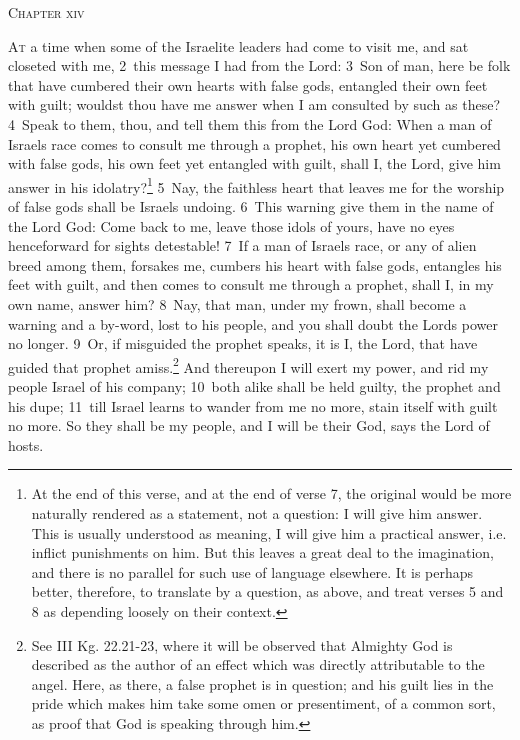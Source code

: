 \documentclass[10pt]{book} %
\begin{document}
\begin{large}\begin{center}\textsc{Chapter xiv}\end{center}\end{large}
\lettrine[lines=2]{A}{t} a time when some of the Israelite leaders had come to visit me, and sat closeted with me, \textcolor{benred8}{2}~this message I had from the Lord: \textcolor{benred8}{3}~Son of man, here be folk that have cumbered their own hearts with false gods, entangled their own feet with guilt; wouldst thou have me answer when I am consulted by such as these? \textcolor{benred8}{4}~Speak to them, thou, and tell them this from the Lord God: When a man of Israel\textquotesingle s race comes to consult me through a prophet, his own heart yet cumbered with false gods, his own feet yet entangled with guilt, shall I, the Lord, give him answer in his idolatry?\footnote[1]{At the end of this verse, and at the end of verse 7, the original would be more naturally rendered as a statement, not a question: \textasciigrave I will give him answer\textquotesingle . This is usually understood as meaning, \textasciigrave I will give him a practical answer, i.e. inflict punishments on him\textquotesingle . But this leaves a great deal to the imagination, and there is no parallel for such use of language elsewhere. It is perhaps better, therefore, to translate by a question, as above, and treat verses 5 and 8 as depending loosely on their context.} \textcolor{benred8}{5}~Nay, the faithless heart that leaves me for the worship of false gods shall be Israel\textquotesingle s undoing. \textcolor{benred8}{6}~This warning give them in the name of the Lord God: Come back to me, leave those idols of yours, have no eyes henceforward for sights detestable! \textcolor{benred8}{7}~If a man of Israel\textquotesingle s race, or any of alien breed among them, forsakes me, cumbers his heart with false gods, entangles his feet with guilt, and then comes to consult me through a prophet, shall I, in my own name, answer him? \textcolor{benred8}{8}~Nay, that man, under my frown, shall become a warning and a by-word, lost to his people, and you shall doubt the Lord\textquotesingle s power no longer. \textcolor{benred8}{9}~Or, if misguided the prophet speaks, it is I, the Lord, that have guided that prophet amiss.\footnote[2]{See III Kg. 22.21-23, where it will be observed that Almighty God is described as the author of an effect which was directly attributable to the angel. Here, as there, a false prophet is in question; and his guilt lies in the pride which makes him take some omen or presentiment, of a common sort, as proof that God is speaking through him.} And thereupon I will exert my power, and rid my people Israel of his company; \textcolor{benred8}{10}~both alike shall be held guilty, the prophet and his dupe; \textcolor{benred8}{11}~till Israel learns to wander from me no more, stain itself with guilt no more. So they shall be my people, and I will be their God, says the Lord of hosts.
\end{document}

